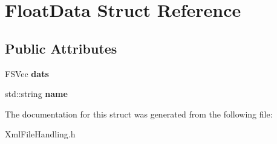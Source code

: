 \hypertarget{structFloatData}{
\section{FloatData Struct Reference}
\label{structFloatData}
}
\subsection*{Public Attributes}
\begin{DoxyCompactItemize}
\item 
\hypertarget{structFloatData_af6d95e96435c77a11d099d03f658931d}{
FSVec {\bfseries dats}}
\label{structFloatData_af6d95e96435c77a11d099d03f658931d}

\item 
\hypertarget{structFloatData_a036c933c4ed3ccea5a4b7363f833514b}{
std::string {\bfseries name}}
\label{structFloatData_a036c933c4ed3ccea5a4b7363f833514b}

\end{DoxyCompactItemize}


The documentation for this struct was generated from the following file:\begin{DoxyCompactItemize}
\item 
XmlFileHandling.h\end{DoxyCompactItemize}
